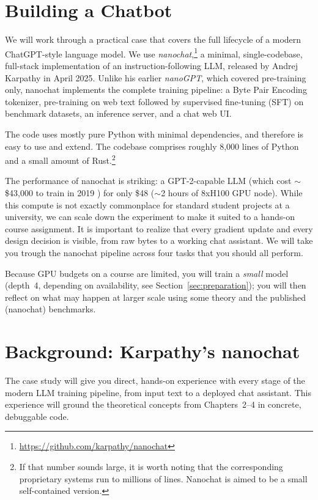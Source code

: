 \section{Building a Chatbot}
We will work through a practical case that covers the full lifecycle of a modern ChatGPT-style language model.  We use \textit{nanochat},\footnote{\url{https://github.com/karpathy/nanochat}} a minimal, single-codebase, full-stack implementation of an instruction-following LLM, released by Andrej Karpathy in April 2025. Unlike his earlier \textit{nanoGPT}, which covered pre-training only, nanochat implements the complete training pipeline: a Byte Pair Encoding tokenizer, pre-training on web text followed by supervised fine-tuning (SFT) on benchmark datasets, an inference server, and a chat web UI.

The code uses mostly pure Python with minimal dependencies, and therefore is easy to use and extend. The codebase comprises roughly 8{,}000 lines of Python and a small amount of Rust.\footnote{If that number sounds large, it is worth noting that the corresponding proprietary systems run to millions of lines. Nanochat is aimed to be a small self-contained version.}

The performance of nanochat is striking: a GPT-2-capable LLM (which cost $\sim$\$43,000 to train in 2019 \citep{radford2019language}) for only \$48 ($\sim$2 hours of 8xH100 GPU node). While this compute is not exactly commonplace for standard student projects at a university, we can scale down the experiment to make it suited to a hands-on course assignment. It is important to realize that every gradient update and every design decision is visible, from raw bytes to a working chat assistant.
We will take you trough the nanochat pipeline across four tasks that you should all perform. 

Because GPU budgets on a course are limited, you will train a \emph{small} model (depth~4, depending on availability, see Section~\ref{sec:preparation}); you will then reflect on what may happen at larger scale using some theory and the published (nanochat) benchmarks.

\label{sec:learning-goals}

\section{Background: Karpathy's nanochat}
\label{sec:background}
The case study will give you direct, hands-on experience with every stage of the modern LLM training pipeline, from input text to a deployed chat assistant. This experience will ground the theoretical concepts from Chapters~2--4 in concrete, debuggable code.



